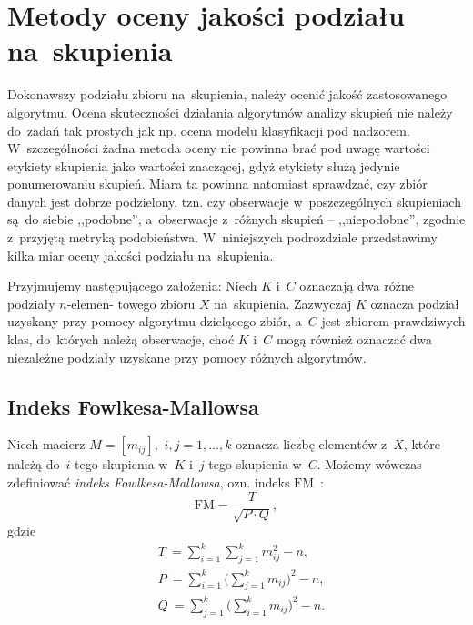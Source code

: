 \documentclass{praca1}
\begin{document}
\section{Metody oceny jakości podziału na~skupienia}	

Dokonawszy podziału zbioru na~skupienia, należy ocenić jakość zastosowanego algorytmu. Ocena skuteczności działania algorytmów analizy skupień nie należy do~zadań tak prostych jak np. ocena modelu klasyfikacji pod nadzorem. W~szczególności żadna metoda oceny nie powinna brać pod uwagę wartości etykiety skupienia jako wartości znaczącej, gdyż etykiety służą jedynie ponumerowaniu skupień. Miara ta powinna natomiast sprawdzać, czy zbiór danych jest dobrze podzielony, tzn. czy obserwacje w~poszczególnych skupieniach są~do siebie ,,podobne'', a~obserwacje z~różnych skupień -- ,,niepodobne'', zgodnie z~przyjętą metryką podobieństwa. W~niniejszych podrozdziale przedstawimy kilka miar oceny jakości podziału na~skupienia.

Przyjmujemy następującego założenia: Niech $K$ i~$C$ oznaczają dwa różne podziały $n$-elemen- towego zbioru $X$ na~skupienia. Zazwyczaj $K$ oznacza podział uzyskany przy pomocy algorytmu dzielącego zbiór, a~$C$ jest zbiorem prawdziwych klas, do~których należą obserwacje, choć $K$ i~$C$ mogą również oznaczać dwa niezależne podziały uzyskane przy pomocy różnych algorytmów.

\subsection{Indeks Fowlkesa-Mallowsa}

\begin{definition}
Niech macierz $M = [m_{ij}],$ $i,j = 1,\ldots, k$ oznacza liczbę elementów z~$X$, które należą do~$i$-tego skupienia w~$K$ i~$j$-tego skupienia w~$C$. Możemy wówczas zdefiniować \emph{indeks Fowlkesa-Mallowsa}, ozn. indeks $\mathrm{FM}$~\cite{Fowlkes1983:fmindex}:
\begin{equation}
\mathrm{FM} = \frac{T}{\sqrt{P\cdot Q}},
\end{equation}
gdzie 
\begin{align*}
& T~= \sum\limits_{i=1}^{k}\sum\limits_{j=1}^{k} m_{ij}^2 - n,\\
& P~= \sum\limits_{i=1}^{k} \bigg(\sum\limits_{j=1}^{k} m_{ij}\bigg)^2 - n,\\
& Q~= \sum\limits_{j=1}^{k} \bigg(\sum\limits_{i=1}^{k} m_{ij}\bigg)^2 - n.
\end{align*}
\end{definition}
\end{document}
